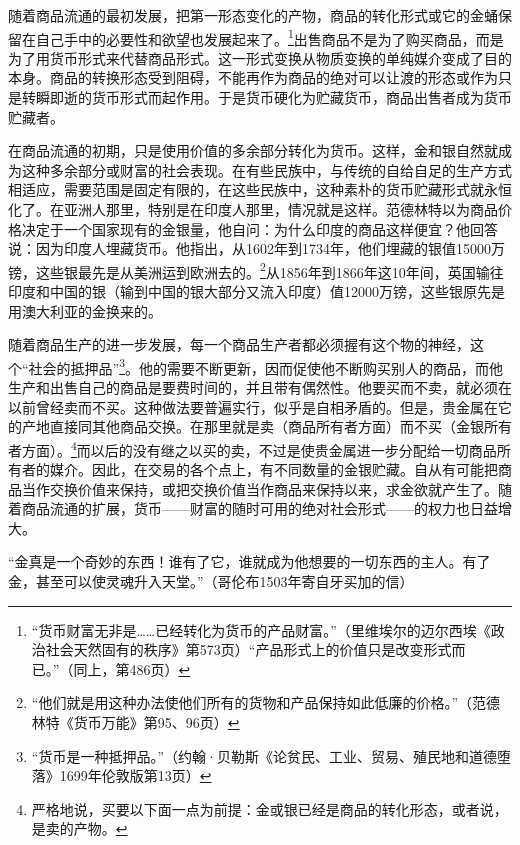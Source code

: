 \documentclass{ctexbook}
\begin{document}
        随着商品流通的最初发展，把第一形态变化的产物，商品的转化形式或它的金蛹保留在自己手中的必要性和欲望也发展起来了。\footnote{“货币财富无非是……已经转化为货币的产品财富。”（里维埃尔的迈尔西埃《政治社会天然固有的秩序》第573页）“产品形式上的价值只是改变形式而已。”（同上，第486页）}出售商品不是为了购买商品，而是为了用货币形式来代替商品形式。这一形式变换从物质变换的单纯媒介变成了目的本身。商品的转换形态受到阻碍，不能再作为商品的绝对可以让渡的形态或作为只是转瞬即逝的货币形式而起作用。于是货币硬化为贮藏货币，商品出售者成为货币贮藏者。

        在商品流通的初期，只是使用价值的多余部分转化为货币。这样，金和银自然就成为这种多余部分或财富的社会表现。在有些民族中，与传统的自给自足的生产方式相适应，需要范围是固定有限的，在这些民族中，这种素朴的货币贮藏形式就永恒化了。在亚洲人那里，特别是在印度人那里，情况就是这样。范德林特以为商品价格决定于一个国家现有的金银量，他自问：为什么印度的商品这样便宜？他回答说：因为印度人埋藏货币。他指出，从1602年到1734年，他们埋藏的银值15000万镑，这些银最先是从美洲运到欧洲去的。\footnote{“他们就是用这种办法使他们所有的货物和产品保持如此低廉的价格。”（范德林特《货币万能》第95、96页）}从1856年到1866年这10年间，英国输往印度和中国的银（输到中国的银大部分又流入印度）值12000万镑，这些银原先是用澳大利亚的金换来的。

        随着商品生产的进一步发展，每一个商品生产者都必须握有这个物的神经，这个“社会的抵押品”\footnote{“货币是一种抵押品。”（约翰·贝勒斯《论贫民、工业、贸易、殖民地和道德堕落》1699年伦敦版第13页）}。他的需要不断更新，因而促使他不断购买别人的商品，而他生产和出售自己的商品是要费时间的，并且带有偶然性。他要买而不卖，就必须在以前曾经卖而不买。这种做法要普遍实行，似乎是自相矛盾的。但是，贵金属在它的产地直接同其他商品交换。在那里就是卖（商品所有者方面）而不买（金银所有者方面）。\footnote{严格地说，买要以下面一点为前提：金或银已经是商品的转化形态，或者说，是卖的产物。}而以后的没有继之以买的卖，不过是使贵金属进一步分配给一切商品所有者的媒介。因此，在交易的各个点上，有不同数量的金银贮藏。自从有可能把商品当作交换价值来保持，或把交换价值当作商品来保持以来，求金欲就产生了。随着商品流通的扩展，货币——财富的随时可用的绝对社会形式——的权力也日益增大。

        “金真是一个奇妙的东西！谁有了它，谁就成为他想要的一切东西的主人。有了金，甚至可以使灵魂升入天堂。”（哥伦布1503年寄自牙买加的信）
\end{document}
